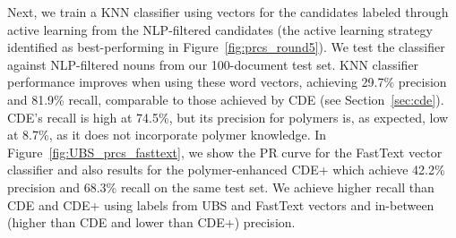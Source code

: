 Next, we train a KNN classifier using vectors for the candidates labeled through active learning from the NLP-filtered candidates (the active learning strategy identified as best-performing in Figure~\ref{fig:prcs_round5}).
We test the classifier against NLP-filtered nouns from our 100-document test set.
KNN classifier performance improves when using these word vectors, 
achieving 29.7\% precision and 81.9\% recall,
comparable to those achieved by CDE (see Section~\ref{sec:cde}).
CDE's recall is high
at 74.5\%, but its precision for polymers is, as expected, low at 8.7\%, as it does not incorporate polymer knowledge. 
In Figure~\ref{fig:UBS_prcs_fasttext}, we show the PR curve for the FastText vector classifier
and also results for the polymer-enhanced CDE+
which achieve 42.2\% precision and 68.3\% recall on the same test set.
We achieve higher recall than CDE and CDE+ using labels from UBS and FastText vectors 
and in-between (higher than CDE and lower than CDE+)
precision.%

